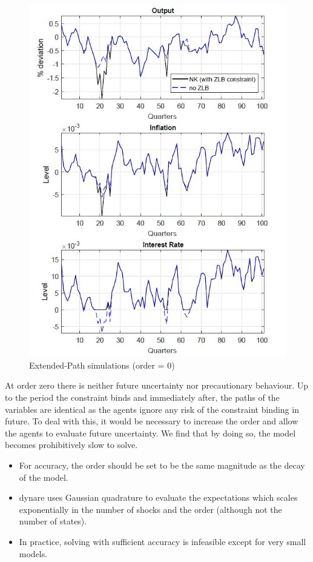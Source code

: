 \documentclass[10pt,math=newtx,citestyle=gb7714-2015,bibstyle=gb7714-2015]{elegantbook}
\begin{document}
{\begin{figure}[htbp!]
	\centering
	\includegraphics[width=0.8\linewidth]{FIG/extendedpath}
	\caption{Extended-Path simulations (order = 0)}\label{4.2}
	\centering
\end{figure}

At order zero there is neither future uncertainty nor precautionary behaviour. Up to the period the constraint binds and immediately after, the paths of the variables are identical as the agents ignore any risk of the constraint binding in
future. To deal with this, it would be necessary to increase the order and allow the agents to evaluate future uncertainty. We find that by doing so, the model becomes prohibitively slow to solve.

\begin{itemize}
	\item For accuracy, the order should be set to be the same magnitude as the decay of the model.
	\item dynare uses Gaussian quadrature to evaluate the expectations which scales exponentially in the number of shocks and the order (although not the number of states).
	\item In practice, solving with sufficient accuracy is infeasible except for very small models.
	

\end{itemize}}
\end{document}
